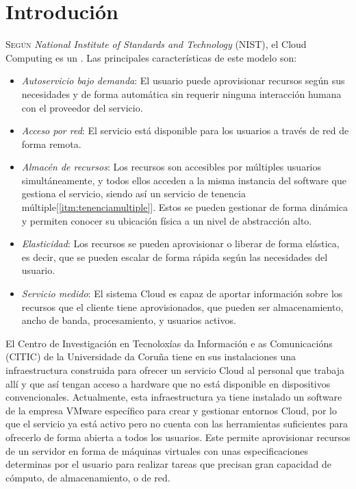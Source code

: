 \chapter{Introdución}
\label{chap:introducion}
\lettrine{S}{egún} \textit{National Institute of Standards and Technology} (NIST), el Cloud Computing es un \cite{DefCloudComputing}. Las principales características de este modelo son\label{nist}:
\begin{itemize}
    \item \emph{Autoservicio bajo demanda}: El usuario puede aprovisionar recursos según sus necesidades y de forma automática sin requerir ninguna interacción humana con el proveedor del servicio.
    \item \emph{Acceso por red}: El servicio está disponible para los usuarios a través de red de forma remota.
    \item \emph{Almacén de recursos}: Los recursos son accesibles por múltiples usuarios simultáneamente, y todos ellos acceden a la misma instancia del software que gestiona el servicio, siendo así un servicio de tenencia múltiple[\ref{itm:tenenciamultiple}]. Estos se pueden gestionar de forma dinámica y permiten conocer su ubicación física a un nivel de abstracción alto.
    \item \emph{Elasticidad}: Los recursos se pueden aprovisionar o liberar de forma elástica, es decir, que se pueden escalar de forma rápida según las necesidades del usuario.
    \item \emph{Servicio medido}: El sistema Cloud es capaz de aportar información sobre los recursos que el cliente tiene aprovisionados, que pueden ser almacenamiento, ancho de banda, procesamiento, y usuarios activos.
\end{itemize}
 
 El Centro de Investigación en Tecnoloxías da Información e as Comunicacións (CITIC) de la Universidade da Coruña tiene en sus instalaciones una infraestructura construida para ofrecer un servicio Cloud al personal que trabaja allí y que así tengan acceso a hardware que no está disponible en dispositivos convencionales. Actualmente, esta infraestructura ya tiene instalado un software de la empresa VMware específico para crear y gestionar entornos Cloud, por lo que el servicio ya está activo pero no cuenta con las herramientas suficientes para ofrecerlo de forma abierta a todos los usuarios. Este permite aprovisionar recursos de un servidor en forma de máquinas virtuales con unas especificaciones determinas por el usuario para realizar tareas que precisan gran capacidad de cómputo, de almacenamiento, o de red.\\
 
